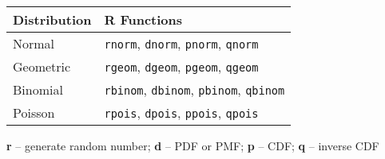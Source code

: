 \documentclass[8pt]{article}
\begin{document}
\vspace{1em}

\begin{center}
\renewcommand{\arraystretch}{1.3}
\begin{tabularx}{0.6\textwidth}{|>{\raggedright\arraybackslash}X|>{\raggedright\arraybackslash}X|}
\hline
\textbf{Distribution} & \textbf{R Functions} \\
\hline
Normal & \texttt{rnorm}, \texttt{dnorm}, \texttt{pnorm}, \texttt{qnorm} \\
\hline
Geometric & \texttt{rgeom}, \texttt{dgeom}, \texttt{pgeom}, \texttt{qgeom} \\
\hline
Binomial & \texttt{rbinom}, \texttt{dbinom}, \texttt{pbinom}, \texttt{qbinom} \\
\hline
Poisson & \texttt{rpois}, \texttt{dpois}, \texttt{ppois}, \texttt{qpois} \\
\hline
\end{tabularx}

\vspace{0.5em}
\textbf{r} -- generate random number; \textbf{d} -- PDF or PMF; \textbf{p} -- CDF; \textbf{q} -- inverse CDF
\end{center}
\end{document}

